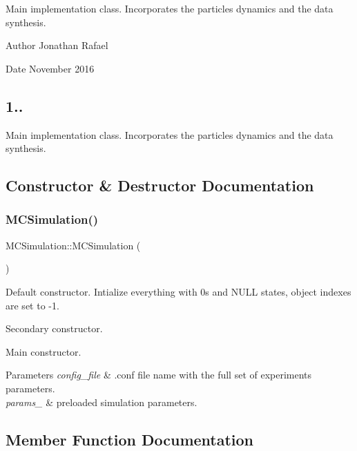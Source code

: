 Main implementation class. Incorporates the particle\textquotesingle{}s dynamics and the data synthesis. \begin{DoxyAuthor}{Author}
Jonathan Rafael 
\end{DoxyAuthor}
\begin{DoxyDate}{Date}
November 2016 \subsection*{1.. }
\end{DoxyDate}


Main implementation class. Incorporates the particle\textquotesingle{}s dynamics and the data synthesis. 

\subsection{Constructor \& Destructor Documentation}
\mbox{\label{class_m_c_simulation_a89f56682a13f0bcb2c53d191ca336e35}} 
\subsubsection{\texorpdfstring{M\+C\+Simulation()}{MCSimulation()}}
{\footnotesize\ttfamily M\+C\+Simulation\+::\+M\+C\+Simulation (\begin{DoxyParamCaption}{ }\end{DoxyParamCaption})}



Default constructor. Intialize everything with 0\textquotesingle{}s and N\+U\+LL states, object indexes are set to -\/1. 

Secondary constructor.

Main constructor.


\begin{DoxyParams}{Parameters}
{\em config\+\_\+file} & .conf file name with the full set of experiments parameters.\\
\hline
{\em params\+\_\+} & preloaded simulation parameters. \\
\hline
\end{DoxyParams}


\subsection{Member Function Documentation}
\mbox{\label{class_m_c_simulation_aa60234e3f6d2a100c8b03e4f304b07f4}} 

